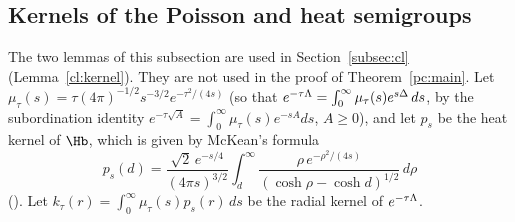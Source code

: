 \subsection{Kernels of the Poisson and heat semigroups}

The two lemmas of this subsection are used in Section~\ref{subsec:cl} (Lemma~\ref{cl:kernel}). They are not used in the proof of
Theorem~\ref{pc:main}.
Let $\mu_\tau(s)=\tau(4\pi)^{-1/2}s^{-3/2}e^{-\tau^2/(4s)}$ (so that $e^{-\tau\Lambda}=\int_0^\infty\mu_\tau(s)e^{s\Delta}\,ds$, by
the subordination identity $e^{-\tau\sqrt A}=\int_0^\infty\mu_\tau(s)e^{-sA}ds$, $A\ge0$), and let $p_s$ be the heat kernel of $\Hb$, which is
given by McKean's formula
\[
p_s(d)=\frac{\sqrt2\,e^{-s/4}}{(4\pi s)^{3/2}}\int_d^\infty\frac{\rho\,e^{-\rho^2/(4s)}}{(\cosh\rho-\cosh d)^{1/2}}\,d\rho
\]
(\cite[(1.7)]{GN98}). Let
$k_\tau(r)=\int_0^\infty\mu_\tau(s)p_s(r)\,ds$ be the radial kernel of $e^{-\tau\Lambda}$.

